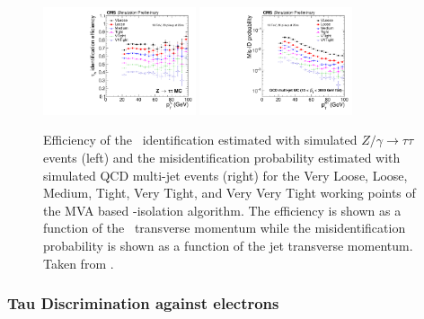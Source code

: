 \begin{figure}[ht]
  \begin{center}
    \includegraphics[width=0.4\textwidth]{figuras/Chapter3/TauEfficiency}
    \includegraphics[width=0.4\textwidth]{figuras/Chapter3/TauMissID}
    \caption{
    Efficiency of the \tauh~identification estimated with simulated $Z/\gamma \rightarrow \tau\tau$ events (left)
    and the misidentification probability estimated with simulated QCD multi-jet events (right) for 
    the Very Loose, Loose, Medium, Tight, Very Tight, and Very Very Tight working points of the MVA 
    based \tauh-isolation algorithm. The efficiency is shown as a function of the \tauh~transverse 
    momentum while the misidentification probability is shown as a function of the jet transverse momentum. Taken from \cite{CMS-PAS-TAU-16-002}.
    }
    \label{fig:TauEff}
  \end{center}
\end{figure} 

\subsubsection{Tau Discrimination against electrons}
\label{subsubsec:DiscriminatorsAgainstElectron}

